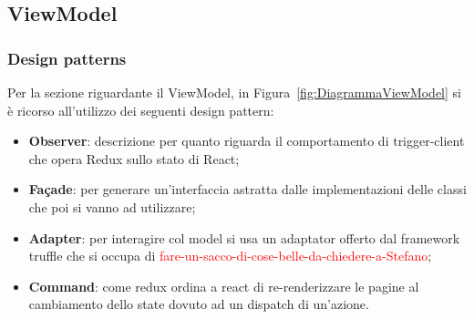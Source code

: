 
	
	\subsection{ViewModel}
		\subsubsection{Design patterns}
		Per la sezione riguardante il ViewModel, in Figura~\ref{fig:DiagrammaViewModel} si è ricorso all'utilizzo dei seguenti design pattern:
			\begin{itemize}
				\item \textbf{Observer}: descrizione per quanto riguarda il comportamento di trigger-client che opera Redux sullo stato di React;
				\item \textbf{Façade}: per generare un'interfaccia astratta dalle implementazioni delle classi che poi si vanno ad utilizzare;
				\item \textbf{Adapter}: per interagire col model si usa un adaptator offerto dal framework truffle che si occupa di {\textcolor{red}{fare-un-sacco-di-cose-belle-da-chiedere-a-Stefano}};
				\item \textbf{Command}: come redux ordina a react di re-renderizzare le pagine al cambiamento dello state dovuto ad un dispatch di un'azione.
			\end{itemize}

